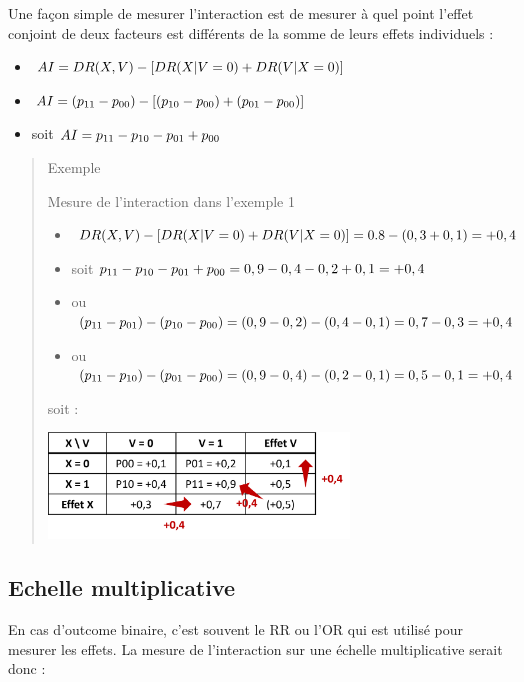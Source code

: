 \documentclass[
]{book}
\providecommand{\tightlist}{%
  \setlength{\itemsep}{0pt}\setlength{\parskip}{0pt}}
\begin{document}
Une façon simple de mesurer l'interaction est de mesurer à quel point l'effet conjoint de deux facteurs est différents de la somme de leurs effets individuels \citet{vanderweele_tutorial_2014} :

\begin{itemize}
\tightlist
\item
  \(\small AI = DR(X,V) - [DR(X|V=0) + DR(V|X=0)]\)
\item
  \(\small AI = (p_{11} - p_{00}) - [(p_{10} - p_{00}) + (p_{01} - p_{00})]\)
\item
  soit \(\small AI =p_{11} - p_{10} - p_{01} + p_{00}\)
\end{itemize}

\begin{quote}
Exemple

Mesure de l'interaction dans l'exemple 1

\begin{itemize}
\tightlist
\item
  \(\small DR(X, V) - [DR(X|V=0) + DR(V|X=0)] = 0.8 - (0,3 + 0,1) = +0,4\)
\item
  soit \(\small p_{11} - p_{10} - p_{01} + p_{00} = 0,9 - 0,4 - 0,2 + 0,1 = +0,4\)
\item
  ou \(\small (p_{11} - p_{01}) - (p_{10} - p_{00}) = (0,9 - 0,2) - (0,4 - 0,1) = 0,7 - 0,3 = +0,4\)
\item
  ou \(\small (p_{11} - p_{10}) - (p_{01} - p_{00}) = (0,9 - 0,4) - (0,2 - 0,1) = 0,5 - 0,1 = +0,4\)
\end{itemize}

soit :

\includegraphics[width=0.65\textwidth,height=\textheight]{img/Image2.png}
\end{quote}

\hypertarget{echelle-multiplicative}{%
\subsection*{Echelle multiplicative}\label{echelle-multiplicative}}

En cas d'outcome binaire, c'est souvent le RR ou l'OR qui est utilisé pour mesurer les effets. La mesure de l'interaction sur une échelle multiplicative serait donc \citet{vanderweele_tutorial_2014} :
\end{document}
